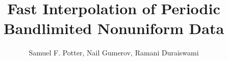\documentclass{article}
\title{Fast Interpolation of Periodic Bandlimited Nonuniform Data}
\author{Samuel F. Potter, Nail Gumerov, Ramani Duraiswami}
\begin{document}
\maketitle



\tableofcontents












\appendix


\clearpage
{}

\end{document}
